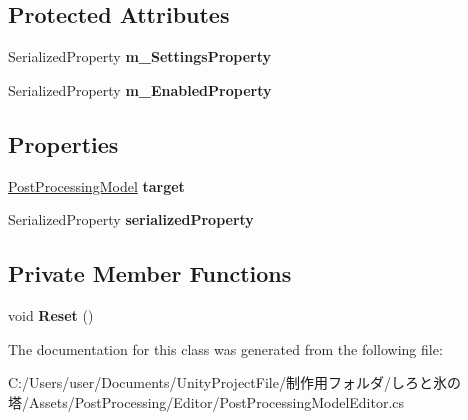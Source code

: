 \subsection*{Protected Attributes}
\begin{DoxyCompactItemize}
\item 
\mbox{\label{class_unity_editor_1_1_post_processing_1_1_post_processing_model_editor_a4c15114294b905462f55c9cca5a9fae3}} 
Serialized\+Property {\bfseries m\+\_\+\+Settings\+Property}
\item 
\mbox{\label{class_unity_editor_1_1_post_processing_1_1_post_processing_model_editor_a1cb2826825c2c94ba93b07c74bacb36d}} 
Serialized\+Property {\bfseries m\+\_\+\+Enabled\+Property}
\end{DoxyCompactItemize}
\subsection*{Properties}
\begin{DoxyCompactItemize}
\item 
\mbox{\label{class_unity_editor_1_1_post_processing_1_1_post_processing_model_editor_a53c7a213e12f6be0712a6cb752bf61ec}} 
\hyperlink{class_unity_engine_1_1_post_processing_1_1_post_processing_model}{Post\+Processing\+Model} {\bfseries target}
\item 
\mbox{\label{class_unity_editor_1_1_post_processing_1_1_post_processing_model_editor_a64e8869152a0ca85df60e69ba1033e16}} 
Serialized\+Property {\bfseries serialized\+Property}
\end{DoxyCompactItemize}
\subsection*{Private Member Functions}
\begin{DoxyCompactItemize}
\item 
\mbox{\label{class_unity_editor_1_1_post_processing_1_1_post_processing_model_editor_a01a98d872ec60a232699f60ffd7fabb7}} 
void {\bfseries Reset} ()
\end{DoxyCompactItemize}


The documentation for this class was generated from the following file\+:\begin{DoxyCompactItemize}
\item 
C\+:/\+Users/user/\+Documents/\+Unity\+Project\+File/制作用フォルダ/しろと氷の塔/\+Assets/\+Post\+Processing/\+Editor/Post\+Processing\+Model\+Editor.\+cs\end{DoxyCompactItemize}
